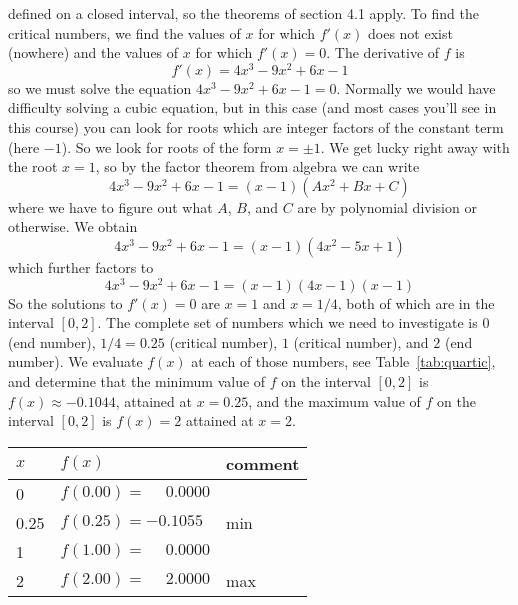 \documentclass{article}
\begin{document}
\begin{enumerate}
\begin{enumerate}
    defined on a closed interval, so the theorems of section 4.1 apply.
    To find the critical numbers, we find the values of $x$ for which
    $f'(x)$ does not exist (nowhere) and the values of $x$ for which $f'(x)=0$.
    The derivative of $f$ is
    \begin{equation*}
      f'(x)=4x^3-9x^2+6x-1
    \end{equation*}
    so we must solve the equation $4x^3-9x^2+6x-1=0$.  Normally we would have
    difficulty solving a cubic equation, but in this case (and most cases
    you'll see in this course) you can look for roots which are integer
    factors of the constant term (here $-1$).  So we look for roots of the
    form $x=\pm 1$.  We get lucky right away with the root $x=1$, so by the
    factor theorem from algebra we can write
    \begin{equation*}
      4x^3-9x^2+6x-1=(x-1)(Ax^2+Bx+C)
    \end{equation*}
    where we have to figure out what $A$, $B$, and $C$ are by polynomial
    division or otherwise.  We obtain
    \begin{equation*}
      4x^3-9x^2+6x-1 = (x-1) (4x^2-5x+1)
    \end{equation*}
    which further factors to
    \begin{equation*}
      4x^3-9x^2+6x-1 = (x-1)(4x-1)(x-1)
    \end{equation*}
    So the solutions to $f'(x)=0$ are $x=1$ and $x=1/4$, both of which are
    in the interval $[0,2]$.  The complete set of numbers which we need to
    investigate is $0$ (end number), $1/4=0.25$ (critical number), $1$ (critical
    number), and $2$ (end number).  We evaluate $f(x)$ at each of those
    numbers, see Table~\ref{tab:quartic}, and determine that the minimum
    value of $f$ on the interval $[0,2]$ is $f(x)\approx-0.1044$, attained
    at $x=0.25$, and the maximum value of $f$ on the interval $[0,2]$ is
    $f(x)=2$ attained at $x=2$.
    \begin{table}[htbp]
      \centering
      \begin{tabular}{|l|l|l|}
        \hline 
        $x$  & $f(x)$                      & comment \\ \hline\hline
        0    & $f(0.00)=\phantom{-}0.0000$ &         \\ \hline
        0.25 & $f(0.25)=          -0.1055$ & min     \\ \hline
        1    & $f(1.00)=\phantom{-}0.0000$ &         \\ \hline 
        2    & $f(2.00)=\phantom{-}2.0000$ & max     \\ \hline

\end{tabular}
\end{table}
\end{enumerate}
\end{enumerate}
\end{document}
